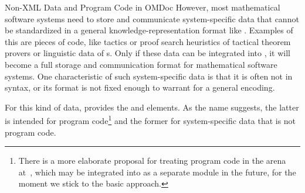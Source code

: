 \begin{module}[id=ext]
\begin{omgroup}[id=ext,short=Auxiliary Elements]
\begin{omgroup}[id=private]{Non-XML Data and Program Code in OMDoc}
However, most mathematical software systems need to store and communicate system-specific
data that cannot be standardized in a general knowledge-representation format like
\omdoc. Examples of this are pieces of {} code, like tactics or proof
search heuristics of tactical theorem provers or linguistic data of
{s}.  Only if these data can be integrated into
\omdoc, it will become a full storage and communication format for mathematical software
systems. One characteristic of such system-specific data is that it is often not in {\xml}
syntax, or its format is not fixed enough to warrant for a general {\xml} encoding.
  
\begin{definition}[id=privatecode.def]
  For this kind of data, \omdoc provides the {} and {}
  elements. As the name suggests, the latter is intended for program code\footnote{There
    is a more elaborate proposal for treating program code in the \omdoc arena
    at~\cite{Kohlhase:codemlspec}, which may be integrated into \omdoc as a separate
    module in the future, for the moment we stick to the basic approach.} and the former
  for system-specific data that is not program code.
  

\end{definition}
\end{omgroup}
\end{omgroup}
\end{module}

